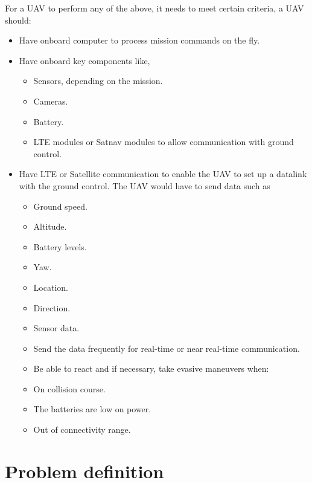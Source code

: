 For a UAV to perform any of the above, it needs to meet certain criteria, a UAV should:
\begin{itemize}
    \item Have onboard computer to process mission commands on the fly.
    \item Have onboard key components like,
          \begin{itemize}
              \item Sensors, depending on the mission.
              \item Cameras.
              \item Battery.
              \item LTE modules or Satnav modules to allow communication with ground control.
          \end{itemize}
    \item Have LTE or Satellite communication to enable the UAV to set up a datalink with the ground control. The UAV would have to send data such as
          \begin{itemize}
              \item	Ground speed.
              \item	Altitude.
              \item	Battery levels.
              \item	Yaw.
              \item	Location.
              \item	Direction.
              \item	Sensor data.
              \item	Send the data frequently for real-time or near real-time communication.
              \item	Be able to react and if necessary, take evasive maneuvers when:
              \item	On collision course.
              \item	The batteries are low on power.
              \item	Out of connectivity range.
          \end{itemize}
\end{itemize}


\section{Problem definition}

